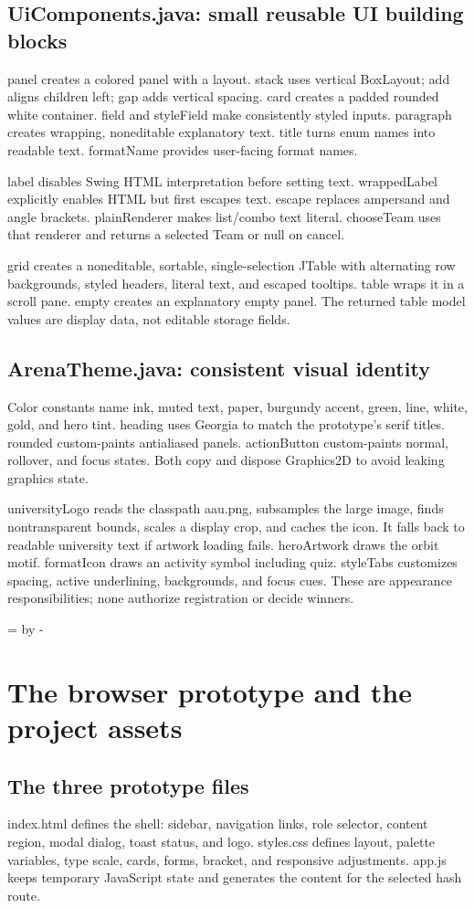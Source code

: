 \documentclass[12pt]{article}
\newcommand{\topic}[1]{\needroom{9\baselineskip}\section{#1}}
\newcommand{\needroom}[1]{\par\begingroup\dimen0=\pagegoal\advance\dimen0 by -\pagetotal\ifdim\dimen0<#1\newpage\fi\endgroup}
\begin{document}
\subsection{UiComponents.java: small reusable UI building blocks}
panel creates a colored panel with a layout. stack uses vertical BoxLayout; add aligns children left; gap adds vertical spacing. card creates a padded rounded white container. field and styleField make consistently styled inputs. paragraph creates wrapping, noneditable explanatory text. title turns enum names into readable text. formatName provides user-facing format names.

label disables Swing HTML interpretation before setting text. wrappedLabel explicitly enables HTML but first escapes text. escape replaces ampersand and angle brackets. plainRenderer makes list/combo text literal. chooseTeam uses that renderer and returns a selected Team or null on cancel.

grid creates a noneditable, sortable, single-selection JTable with alternating row backgrounds, styled headers, literal text, and escaped tooltips. table wraps it in a scroll pane. empty creates an explanatory empty panel. The returned table model values are display data, not editable storage fields.

\subsection{ArenaTheme.java: consistent visual identity}
Color constants name ink, muted text, paper, burgundy accent, green, line, white, gold, and hero tint. heading uses Georgia to match the prototype's serif titles. rounded custom-paints antialiased panels. actionButton custom-paints normal, rollover, and focus states. Both copy and dispose Graphics2D to avoid leaking graphics state.

universityLogo reads the classpath aau.png, subsamples the large image, finds nontransparent bounds, scales a display crop, and caches the icon. It falls back to readable university text if artwork loading fails. heroArtwork draws the orbit motif. formatIcon draws an activity symbol including quiz. styleTabs customizes spacing, active underlining, backgrounds, and focus cues. These are appearance responsibilities; none authorize registration or decide winners.

\topic{The browser prototype and the project assets}
\subsection{The three prototype files}
index.html defines the shell: sidebar, navigation links, role selector, content region, modal dialog, toast status, and logo. styles.css defines layout, palette variables, type scale, cards, forms, bracket, and responsive adjustments. app.js keeps temporary JavaScript state and generates the content for the selected hash route.
\end{document}
